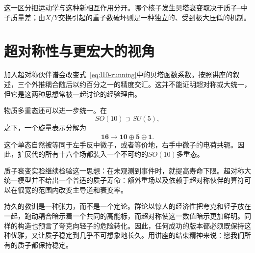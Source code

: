 这一区分把运动学与这种新相互作用分开。哪个核子发生贝塔衰变取决于质子--中子质量差；由\(X/Y\)交换引起的重子数破坏则是一种独立的、受到极大压低的机制。

\section{超对称性与更宏大的视角}

加入超对称伙伴谱会改变式~\eqref{eq:l10-running}中的贝塔函数系数。按照讲座的叙述，三个外推耦合随后以约百分之一的精度交汇。这并不能证明超对称或大统一，但它是这两种思想常被一起讨论的经验理由。

物质多重态还可以进一步统一。在
\begin{equation}
SO(10)\supset SU(5),
\end{equation}
之下，一个旋量表示分解为
\begin{equation}
\mathbf{16}
\longrightarrow
\mathbf{10}\oplus\overline{\mathbf5}\oplus\mathbf1.
\label{eq:l10-so10}
\end{equation}
这个单态自然被等同于左手反中微子，或者等价地，右手中微子的电荷共轭。因此，扩展代的所有十六个场都装入一个不可约的\(SO(10)\)多重态。

质子衰变实验继续检验这一思想：在未观测到事件时，就提高寿命下限。超对称大统一模型并不给出一个普适的质子寿命：额外重场以及依赖于超对称伙伴的算符可以在很宽的范围内改变主导道和衰变率。


持久的教训是一种张力，而不是一个定论。群论以惊人的经济性把夸克和轻子放在一起，跑动耦合暗示着一个共同的高能标，而超对称使这一数值暗示更加鲜明。同样的构造也预言了夸克向轻子的危险转化。因此，任何成功的版本都必须既保持这种优雅，又让质子稳定到几乎不可想象地长久。用讲座的结束精神来说：愿我们所有的质子都保持稳定。
